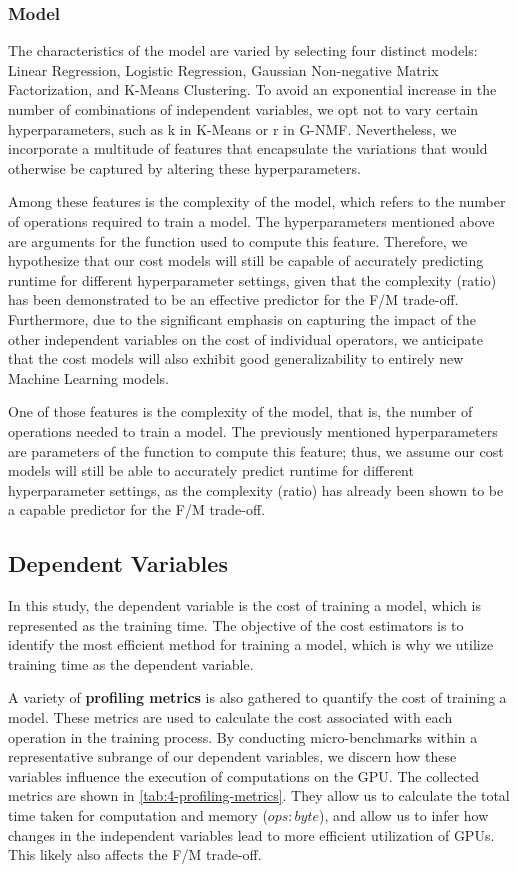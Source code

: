 \subsubsection{Model}
The characteristics of the model are varied by selecting four distinct models: Linear Regression, Logistic Regression, Gaussian Non-negative Matrix Factorization, and K-Means Clustering. To avoid an exponential increase in the number of combinations of independent variables, we opt not to vary certain hyperparameters, such as k in K-Means or r in G-NMF. Nevertheless, we incorporate a multitude of features that encapsulate the variations that would otherwise be captured by altering these hyperparameters.

Among these features is the complexity of the model, which refers to the number of operations required to train a model. The hyperparameters mentioned above are arguments for the function used to compute this feature. Therefore, we hypothesize that our cost models will still be capable of accurately predicting runtime for different hyperparameter settings, given that the complexity (ratio) has been demonstrated to be an effective predictor for the F/M trade-off. Furthermore, due to the significant emphasis on capturing the impact of the other independent variables on the cost of individual operators, we anticipate that the cost models will also exhibit good generalizability to entirely new Machine Learning models.

One of those features is the complexity of the model, that is, the number of operations needed to train a model. The previously mentioned hyperparameters are parameters of the function to compute this feature; thus, we assume our cost models will still be able to accurately predict runtime for different hyperparameter settings, as the complexity (ratio) has already been shown to be a capable predictor for the F/M trade-off.

\subsection{Dependent Variables}
In this study, the dependent variable is the cost of training a model, which is represented as the training time. The objective of the cost estimators is to identify the most efficient method for training a model, which is why we utilize training time as the dependent variable.

A variety of \textbf{profiling metrics} is also gathered to quantify the cost of training a model. These metrics are used to calculate the cost associated with each operation in the training process. By conducting micro-benchmarks within a representative subrange of our dependent variables, we discern how these variables influence the execution of computations on the GPU. The collected metrics are shown in \autoref{tab:4-profiling-metrics}. They allow us to calculate the total time taken for computation and memory ($ops:byte$), and allow us to infer how changes in the independent variables lead to more efficient utilization of GPUs. This likely also affects the F/M trade-off.


